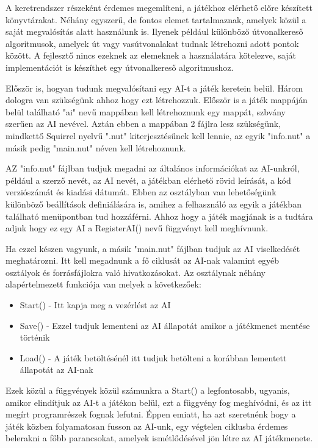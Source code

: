 A keretrendszer részeként érdemes megemlíteni, a játékhoz elérhető előre készített könyvtárakat. Néhány egyszerű, de fontos elemet tartalmaznak, amelyek közül a saját megvalósítás alatt használunk is. Ilyenek például különböző útvonalkereső algoritmusok, amelyek út vagy vasútvonalakat tudnak létrehozni adott pontok között. A fejlesztő nincs ezeknek az elemeknek a használatára kötelezve, saját implementációt is készíthet egy útvonalkereső algoritmushoz.


Először is, hogyan tudunk megvalósítani egy AI-t a játék keretein belül. Három dologra van szükségünk ahhoz hogy ezt létrehozzuk. Először is a játék mappáján belül található "ai" nevű mappában kell létrehoznunk egy mappát, szbvány szerűen az AI nevével. Aztán ebben a mappában 2 fájlra lesz szükségünk, mindkettő Squirrel nyelvű ".nut" kiterjesztésűnek kell lennie, az egyik "info.nut" a másik pedig "main.nut" néven kell létrehoznunk.

AZ "info.nut" fájlban tudjuk megadni az általános információkat az AI-unkról, például a szerző nevét, az AI nevét, a játékban elérhető rövid leírását, a kód verziószámát és kiadási dátumát. Ebben az osztályban van lehetőségünk különböző beállítások definiálására is, amihez a felhasználó az egyik a játékban található menüpontban tud hozzáférni. Ahhoz hogy a játék magjának is a tudtára adjuk hogy ez egy AI a RegisterAI() nevű függvényt kell meghívnunk.

Ha ezzel készen vagyunk, a másik "main.nut" fájlban tudjuk az AI viselkedését meghatározni. Itt kell megadnunk a fő ciklusát az AI-nak valamint egyéb osztályok és forrásfájlokra való hivatkozásokat. Az osztálynak néhány alapértelmezett funkciója van melyek a következőek:

\begin{itemize}
	\item Start() - Itt kapja meg a vezérlést az AI
	\item Save() - Ezzel tudjuk lementeni az AI állapotát amikor a játékmenet mentése történik
	\item Load() - A játék betöltésénél itt tudjuk betölteni a korábban lementett állapotát az AI-nak
\end{itemize}

Ezek közül a függvények közül számunkra a Start() a legfontosabb, ugyanis, amikor elindítjuk az AI-t a játékon belül, ezt a függvény fog meghívódni, és az itt megírt programrészek fognak lefutni. Éppen emiatt, ha azt szeretnénk hogy a játék közben folyamatosan fusson az AI-unk, egy végtelen ciklusba érdemes belerakni a főbb parancsokat, amelyek ismétlődésével jön létre az AI játékmenete.

